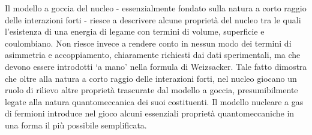 Il modello a goccia del nucleo - essenzialmente fondato sulla natura a corto raggio delle interazioni forti - riesce a
descrivere alcune proprietà del nucleo tra le quali l’esistenza di una energia di legame con termini di volume, superficie e coulombiano.
Non riesce invece a rendere conto in nessun modo dei termini di asimmetria e accoppiamento, chiaramente richiesti dai
dati sperimentali, ma che devono essere introdotti ‘a mano’ nella formula di Weizsacker.
Tale fatto dimostra che oltre alla natura a corto raggio delle interazioni forti, nel nucleo giocano un ruolo di rilievo
altre proprietà trascurate dal modello a goccia, presumibilmente legate alla natura quantomeccanica dei suoi costituenti.
Il modello nucleare a gas di fermioni introduce nel gioco alcuni essenziali proprietà quantomeccaniche in una forma il
più possibile semplificata.





